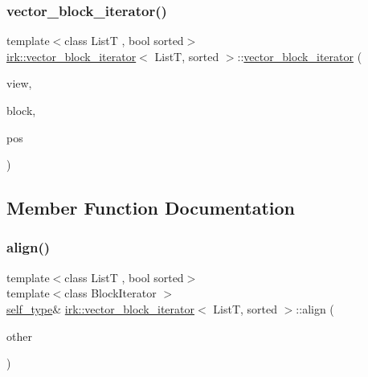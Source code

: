 \subsubsection{\texorpdfstring{vector\+\_\+block\+\_\+iterator()}{vector\_block\_iterator()}\hspace{0.1cm}{\footnotesize\ttfamily [3/3]}}
{\footnotesize\ttfamily template$<$class ListT , bool sorted$>$ \\
\mbox{\hyperlink{classirk_1_1vector__block__iterator}{irk\+::vector\+\_\+block\+\_\+iterator}}$<$ ListT, sorted $>$\+::\mbox{\hyperlink{classirk_1_1vector__block__iterator}{vector\+\_\+block\+\_\+iterator}} (\begin{DoxyParamCaption}\item[{const \mbox{\hyperlink{classirk_1_1vector__block__iterator_aab9b845032870211b56eddcfd9f8cadb}{view\+\_\+type}} \&}]{view,  }\item[{\mbox{\hyperlink{classirk_1_1vector__block__iterator_adc4ee937499f8c9ea24a6f99401b4d22}{difference\+\_\+type}}}]{block,  }\item[{\mbox{\hyperlink{classirk_1_1vector__block__iterator_adc4ee937499f8c9ea24a6f99401b4d22}{difference\+\_\+type}}}]{pos }\end{DoxyParamCaption})\hspace{0.3cm}{\ttfamily [inline]}}



\subsection{Member Function Documentation}
\mbox{\label{classirk_1_1vector__block__iterator_a83fd5704ae4a6f65da799890cc203835}} 
\subsubsection{\texorpdfstring{align()}{align()}}
{\footnotesize\ttfamily template$<$class ListT , bool sorted$>$ \\
template$<$class Block\+Iterator $>$ \\
\mbox{\hyperlink{classirk_1_1vector__block__iterator_a39e5fae2a4258ea1a7cad14a66be2908}{self\+\_\+type}}\& \mbox{\hyperlink{classirk_1_1vector__block__iterator}{irk\+::vector\+\_\+block\+\_\+iterator}}$<$ ListT, sorted $>$\+::align (\begin{DoxyParamCaption}\item[{const Block\+Iterator \&}]{other }\end{DoxyParamCaption})\hspace{0.3cm}{\ttfamily [inline]}}

